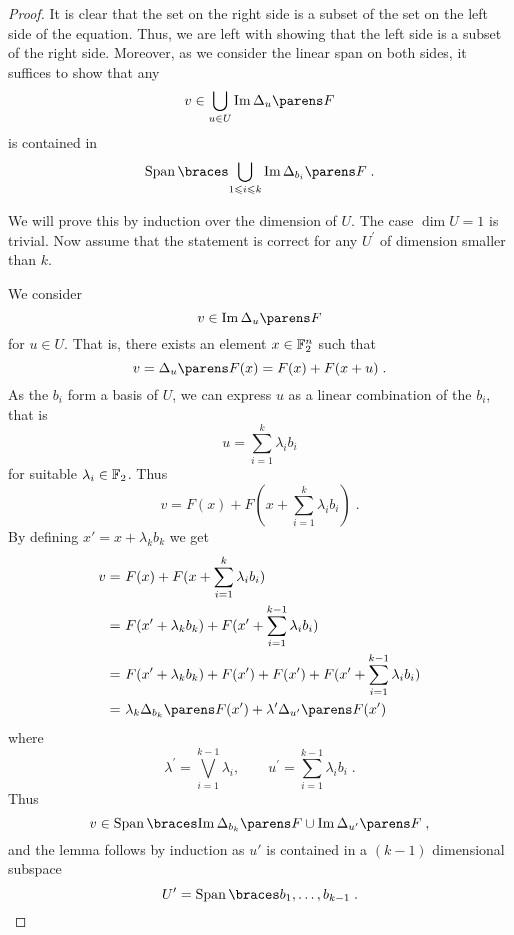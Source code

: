 \begin{proof}
    It is clear that the set on the right side is a subset of the set on the left side of the equation.
    Thus, we are left with showing that the left side is a subset of the right side.
    Moreover, as we consider the linear span on both sides, it suffices to show that any
    \begin{equation*}
        v \in \bigcup_{u \in U} \Im{\derive{u}{F}}
    \end{equation*}
    is contained in
    \begin{equation*}
        \Span{\bigcup_{1 \leqslant i \leqslant k} \Im{\derive{b_i}{F}}}\;.
    \end{equation*}

    We will prove this by induction over the dimension of $U$.
    The case $\dim U =1$ is trivial.
    Now assume that the statement is correct for any $U^\prime$ of dimension smaller than $k$.

    We consider
    \begin{equation*}
        v \in \Im{\derive{u}{F}}
    \end{equation*}
    for $u \in U$.
    That is, there exists an element $x\in \mathbb{F}_2^n$ such that
    \begin{equation*}
        v= \derive{u}{F}(x)= F(x) + F(x + u)\;.
    \end{equation*}
    As the $b_i$ form a basis of $U$, we can express $u$ as a linear combination of the $b_i$, that is
    \begin{equation*}
        u= \sum_{i=1}^k  \lambda_i b_i
    \end{equation*}
    for suitable $\lambda_i \in \mathbb{F}_2$.
    Thus
    \begin{equation*}
        v=F(x) + F(x + \sum_{i=1}^k \lambda_i b_i)\;.
    \end{equation*}
    By defining $x'=x+\lambda_k b_k$ we get
    \begin{align*}
                v= &\ F(x) + F(x + \sum_{i=1}^k \lambda_i b_i) \\
                = &\ F(x^\prime + \lambda_k b_k) +F (x^\prime + \sum_{i=1}^{k-1} \lambda_i b_i) \\
                = &\ F(x^\prime + \lambda_k b_k) + F(x^\prime) + F(x^\prime)+ F(x^\prime + \sum_{i=1}^{k-1} \lambda_i b_i) \\
                = &\ \lambda_k \derive{b_k}{F}(x') + \lambda^\prime \derive{u^\prime}{F}(x')
    \end{align*}
    where
    \begin{equation*}
        \lambda^\prime = \bigvee_{i=1}^{k-1} \lambda_i, \qquad u^\prime = \sum_{i=1}^{k-1} \lambda_i b_i\;.
    \end{equation*}
    Thus
    \begin{equation*}
        v \in \Span{\Im{\derive{b_k}{F}}\cup \Im{\derive{u^\prime}{F}}}\;,
    \end{equation*}
    and the lemma follows by induction as $u'$ is contained in a $(k-1)$ dimensional subspace
    \begin{equation*}
        U^\prime = \Span{b_1,\dots,b_{k-1}}\;.
    \end{equation*}
\end{proof}

